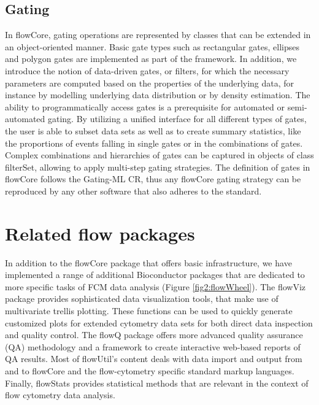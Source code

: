 \documentclass[12pt]{article}
\begin{document}
\subsection*{Gating}
In flowCore, gating operations are represented by classes that can be
extended in an object-oriented manner. Basic gate types such as
rectangular gates, ellipses and polygon gates are implemented as part
of the framework. In addition, we introduce the notion of data-driven
gates, or filters, for which the necessary parameters are computed
based on the properties of the underlying data, for instance by
modelling underlying data distribution or by density estimation. The
ability to programmatically access gates is a prerequisite for
automated or semi-automated gating. By utilizing a unified interface
for all different types of gates, the user is able to subset data sets
as well as to create summary statistics, like the proportions of
events falling in single gates or in the combinations of
gates. Complex combinations and hierarchies of gates can be captured
in objects of class filterSet, allowing to apply multi-step gating
strategies. The definition of gates in flowCore follows the Gating-ML
CR, thus any flowCore gating strategy can be reproduced by any other
software that also adheres to the standard.

\section*{Related flow packages}
In addition to the flowCore package that offers basic infrastructure,
we have implemented a range of additional Bioconductor packages that
are dedicated to more specific tasks of FCM data analysis
(Figure \ref{fig2:flowWheel}). The flowViz package provides
sophisticated data visualization tools, that make use of multivariate
trellis plotting. These functions can be used to quickly generate
customized plots for extended cytometry data sets for both direct data
inspection and quality control. The flowQ package offers more advanced
quality assurance (QA) methodology and a framework to create
interactive web-based reports of QA results. Most of flowUtil's
content deals with data import and output from and to flowCore and the
flow-cytometry specific standard markup languages. Finally, flowStats
provides statistical methods that are relevant in the context of flow
cytometry data analysis.


\end{document}
